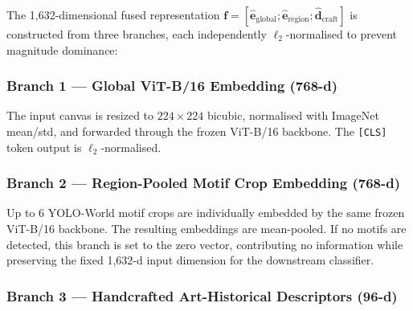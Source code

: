 \documentclass[12pt, a4paper, twoside]{article}
\begin{document}
The 1,632-dimensional fused representation $\mathbf{f} = [\hat{\mathbf{e}}_{\text{global}}; \hat{\mathbf{e}}_{\text{region}}; \hat{\mathbf{d}}_{\text{craft}}]$ is constructed from three branches, each independently ${\ell_2}$-normalised to prevent magnitude dominance:

\subsubsection{Branch 1 — Global ViT-B/16 Embedding (768-d)}
The input canvas is resized to $224 \times 224$ bicubic, normalised with ImageNet mean/std, and forwarded through the frozen ViT-B/16 backbone. The \texttt{[CLS]} token output is ${\ell_2}$-normalised.

\subsubsection{Branch 2 — Region-Pooled Motif Crop Embedding (768-d)}
Up to 6 YOLO-World motif crops are individually embedded by the same frozen ViT-B/16 backbone. The resulting embeddings are mean-pooled. If no motifs are detected, this branch is set to the zero vector, contributing no information while preserving the fixed 1,632-d input dimension for the downstream classifier.

\subsubsection{Branch 3 — Handcrafted Art-Historical Descriptors (96-d)}
\end{document}
